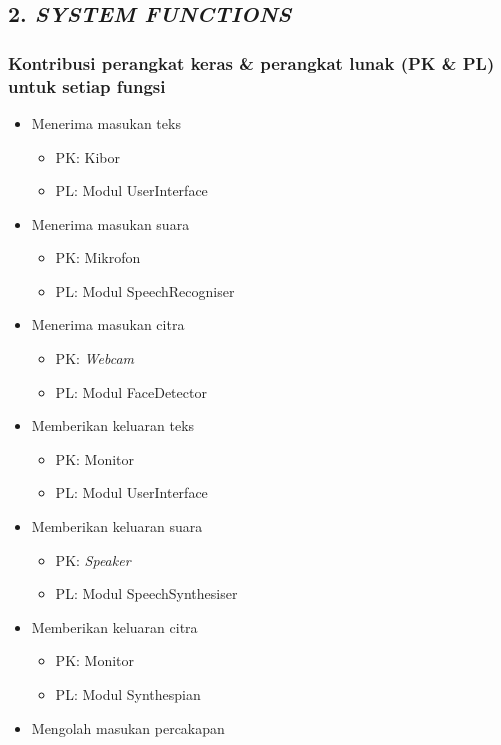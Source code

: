 \subsection*{\textcolor{subsectioncolor}{\textsf{2. \textit{SYSTEM FUNCTIONS}}}}

\subsubsection*{Kontribusi perangkat keras \& perangkat lunak (PK \& PL) untuk setiap fungsi}
\begin{itemize}
\item Menerima masukan teks
	\begin{itemize}
	\item PK: Kibor
	\item PL: Modul UserInterface
	\end{itemize}
\item Menerima masukan suara
	\begin{itemize}
	\item PK: Mikrofon
	\item PL: Modul SpeechRecogniser
	\end{itemize}
\item Menerima masukan citra
	\begin{itemize}
	\item PK: \textit{Webcam}
	\item PL: Modul FaceDetector
	\end{itemize}
\item Memberikan keluaran teks
	\begin{itemize}
	\item PK: Monitor
	\item PL: Modul UserInterface
	\end{itemize}
\item Memberikan keluaran suara
	\begin{itemize}
	\item PK: \textit{Speaker}
	\item PL: Modul SpeechSynthesiser
	\end{itemize}
\item Memberikan keluaran citra
	\begin{itemize}
	\item PK: Monitor
	\item PL: Modul Synthespian
	\end{itemize}
\item Mengolah masukan percakapan

\end{itemize}
